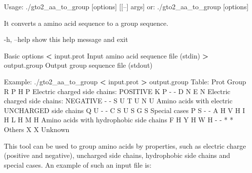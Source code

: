 \documentclass[11pt,]{krantz}
\newenvironment{Shaded}{\begin{snugshade}}{\end{snugshade}}
\newcommand{\OperatorTok}[1]{\textcolor[rgb]{0.43,0.43,0.43}{\textbf{#1}}}
\newcommand{\ExtensionTok}[1]{#1}
\newcommand{\NormalTok}[1]{#1}
\begin{document}
\begin{Shaded}
\begin{Highlighting}[]
\ExtensionTok{Usage}\NormalTok{: ./gto2_aa_to_group [options] [[--] args]}
   \ExtensionTok{or}\NormalTok{: ./gto2_aa_to_group [options]}

\ExtensionTok{It}\NormalTok{ converts a amino acid sequence to a group sequence.}

    \ExtensionTok{-h}\NormalTok{, --help        show this help message and exit}

\ExtensionTok{Basic}\NormalTok{ options}
    \OperatorTok{<} \ExtensionTok{input.prot}\NormalTok{      Input amino acid sequence file (stdin)}
    \OperatorTok{>} \ExtensionTok{output.group}\NormalTok{    Output group sequence file (stdout)}

\ExtensionTok{Example}\NormalTok{: ./gto2_aa_to_group }\OperatorTok{<}\NormalTok{ input.prot }\OperatorTok{>}\NormalTok{ output.group}
\ExtensionTok{Table}\NormalTok{:}
\ExtensionTok{Prot}\NormalTok{    Group}
\ExtensionTok{R}\NormalTok{       P}
\ExtensionTok{H}\NormalTok{       P  Electric charged side chains: POSITIVE}
\ExtensionTok{K}\NormalTok{       P}
\ExtensionTok{-}\NormalTok{       -}
\ExtensionTok{D}\NormalTok{       N}
\ExtensionTok{E}\NormalTok{       N  Electric charged side chains: NEGATIVE}
\ExtensionTok{-}\NormalTok{       -}
\ExtensionTok{S}\NormalTok{       U}
\ExtensionTok{T}\NormalTok{       U}
\ExtensionTok{N}\NormalTok{       U  Amino acids with electric UNCHARGED side chains}
\ExtensionTok{Q}\NormalTok{       U}
\ExtensionTok{-}\NormalTok{       -}
\ExtensionTok{C}\NormalTok{       S}
\ExtensionTok{U}\NormalTok{       S}
\ExtensionTok{G}\NormalTok{       S  Special cases}
\ExtensionTok{P}\NormalTok{       S}
\ExtensionTok{-}\NormalTok{       -}
\ExtensionTok{A}\NormalTok{       H}
\ExtensionTok{V}\NormalTok{       H}
\ExtensionTok{I}\NormalTok{       H}
\ExtensionTok{L}\NormalTok{       H}
\ExtensionTok{M}\NormalTok{       H  Amino acids with hydrophobic side chains}
\ExtensionTok{F}\NormalTok{       H}
\ExtensionTok{Y}\NormalTok{       H}
\ExtensionTok{W}\NormalTok{       H}
\ExtensionTok{-}\NormalTok{       -}
\ExtensionTok{*}\NormalTok{       *  Others}
\ExtensionTok{X}\NormalTok{       X  Unknown}
\end{Highlighting}
\end{Shaded}

This tool can be used to group amino acids by properties, such as
electric charge (positive and negative), uncharged side chains,
hydrophobic side chains and special cases. An example of such an input
file is:
\end{document}
